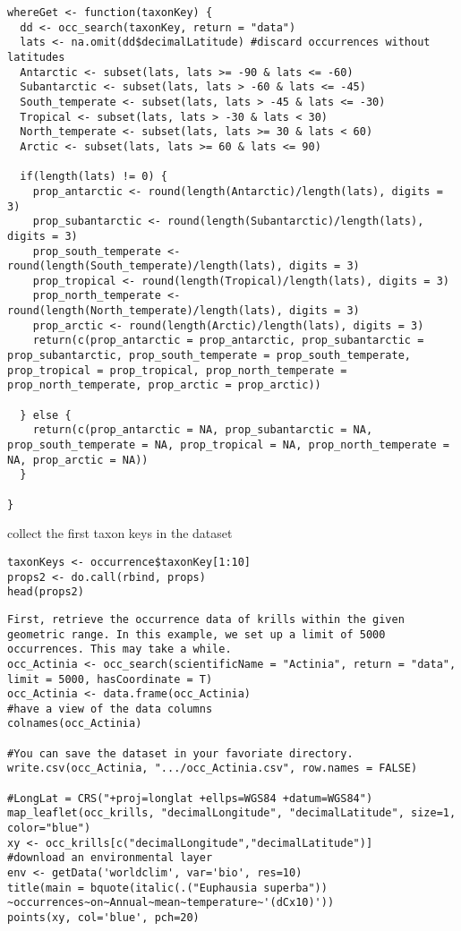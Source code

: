 \documentclass[]{article}
\begin{document}
\begin{verbatim}
whereGet <- function(taxonKey) {
  dd <- occ_search(taxonKey, return = "data")
  lats <- na.omit(dd$decimalLatitude) #discard occurrences without latitudes
  Antarctic <- subset(lats, lats >= -90 & lats <= -60)
  Subantarctic <- subset(lats, lats > -60 & lats <= -45)
  South_temperate <- subset(lats, lats > -45 & lats <= -30)
  Tropical <- subset(lats, lats > -30 & lats < 30)
  North_temperate <- subset(lats, lats >= 30 & lats < 60)
  Arctic <- subset(lats, lats >= 60 & lats <= 90)

  if(length(lats) != 0) {
    prop_antarctic <- round(length(Antarctic)/length(lats), digits = 3)
    prop_subantarctic <- round(length(Subantarctic)/length(lats), digits = 3)
    prop_south_temperate <- round(length(South_temperate)/length(lats), digits = 3)
    prop_tropical <- round(length(Tropical)/length(lats), digits = 3)
    prop_north_temperate <- round(length(North_temperate)/length(lats), digits = 3)
    prop_arctic <- round(length(Arctic)/length(lats), digits = 3)
    return(c(prop_antarctic = prop_antarctic, prop_subantarctic = prop_subantarctic, prop_south_temperate = prop_south_temperate, prop_tropical = prop_tropical, prop_north_temperate = prop_north_temperate, prop_arctic = prop_arctic))

  } else {
    return(c(prop_antarctic = NA, prop_subantarctic = NA, prop_south_temperate = NA, prop_tropical = NA, prop_north_temperate = NA, prop_arctic = NA))
  }

}
\end{verbatim}

collect the first taxon keys in the dataset

\begin{verbatim}
taxonKeys <- occurrence$taxonKey[1:10] 
props2 <- do.call(rbind, props)
head(props2)
\end{verbatim}

\begin{verbatim}
First, retrieve the occurrence data of krills within the given geometric range. In this example, we set up a limit of 5000 occurrences. This may take a while.
occ_Actinia <- occ_search(scientificName = "Actinia", return = "data", limit = 5000, hasCoordinate = T)
occ_Actinia <- data.frame(occ_Actinia)
#have a view of the data columns
colnames(occ_Actinia)

#You can save the dataset in your favoriate directory.
write.csv(occ_Actinia, ".../occ_Actinia.csv", row.names = FALSE)

#LongLat = CRS("+proj=longlat +ellps=WGS84 +datum=WGS84")
map_leaflet(occ_krills, "decimalLongitude", "decimalLatitude", size=1, color="blue")
xy <- occ_krills[c("decimalLongitude","decimalLatitude")]
#download an environmental layer
env <- getData('worldclim', var='bio', res=10) 
title(main = bquote(italic(.("Euphausia superba")) ~occurrences~on~Annual~mean~temperature~'(dCx10)'))
points(xy, col='blue', pch=20)
\end{verbatim}
\end{document}
